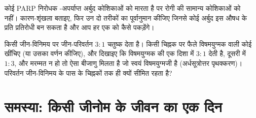 \begin{exercise}[$\star\star\star$]\label{exo:b3:dna-repair:11}
कोई PARP निरोधक \emph{}-अपर्याप्त अर्बुद कोशिकाओं को मारता है पर
रोगी की सामान्य कोशिकाओं को नहीं। कारण-शृंखला बताइए, फिर उन दो तरीकों
का पूर्वानुमान कीजिए जिनसे कोई अर्बुद इस औषध के प्रति प्रतिरोधी बन सकता
है और आप हर एक को कैसे पकड़ेंगे।
\end{exercise}

\begin{exercise}[$\star\star\star$]\label{exo:b3:dna-repair:12}
किसी जीन-विनिमय पर जीन-परिवर्तन $3{:}1$ चतुष्क देता है। किसी चिह्नक पर
फैले विषमयुग्मक वाली कोई  खींचिए (या उसका वर्णन कीजिए), और
दिखाइए कि विषमयुग्मक की  एक दिशा में $3{:}1$ देती है,
दूसरी में $1{:}3$, और मरम्मत न हो तो ऐसा बीजाणु मिलता है जो स्वयं
विषमयुग्मजी है (अर्धसूत्रोत्तर पृथक्करण)। परिवर्तन जीन-विनिमय के पास के
चिह्नकों तक ही क्यों सीमित रहता है?
\end{exercise}

\section{समस्या: किसी जीनोम के जीवन का एक दिन}

